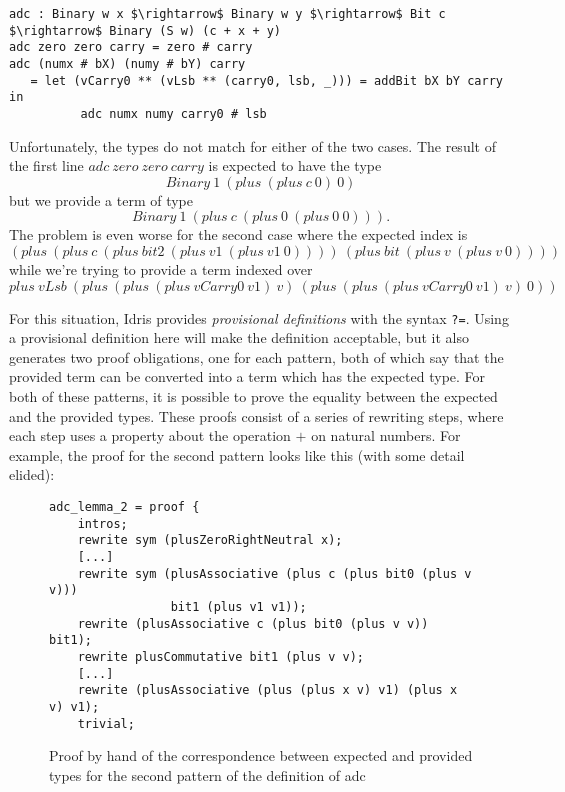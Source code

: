 \begin{lstlisting}
adc : Binary w x $\rightarrow$ Binary w y $\rightarrow$ Bit c $\rightarrow$ Binary (S w) (c + x + y)
adc zero zero carry = zero # carry
adc (numx # bX) (numy # bY) carry
   = let (vCarry0 ** (vLsb ** (carry0, lsb, _))) = addBit bX bY carry in
          adc numx numy carry0 # lsb
\end{lstlisting}

Unfortunately, the types do not match for either of the two cases. 
The result of the first line $adc\ zero\ zero\ carry$ is
expected to have the type\[Binary\ 1\ (plus\ (plus\ c\ 0)\ 0)\] but we
provide a term of type \[Binary\ 1\ (plus\ c\ (plus\ 0\ (plus\ 0\ 0))).\]
The problem is even worse for the second case where the expected index is 
\[(plus\ (plus\ c\ (plus\ bit2\ (plus\ v1\ (plus\ v1\ 0))))\ (plus\ bit\ (plus\ v\ (plus\ v\ 0))))\] while we're trying to provide a term indexed over 
\[plus\ vLsb\ (plus\ (plus\ (plus\ vCarry0\ v1)\ v)\ (plus\ (plus\ (plus\ vCarry0\ v1)\ v)\ 0))\]

For
this situation, Idris provides \emph{provisional definitions} with the 
syntax \texttt{?=}. Using a provisional definition here will make
the definition acceptable, but it also generates two proof obligations, one
for each pattern, both of which say that the provided term can be
converted into a term which has the expected type.  For both of these
patterns, it is possible to prove the equality between the expected and
the provided types. These proofs
consist of a series of rewriting steps, where each step uses a property about the
operation $+$ on natural numbers.  For example, the proof for the second
pattern looks like this (with some detail elided):

\begin{figure}[H]
\figrule
\begin{center}
\begin{lstlisting}
adc_lemma_2 = proof {
    intros;
    rewrite sym (plusZeroRightNeutral x);
    [...]
    rewrite sym (plusAssociative (plus c (plus bit0 (plus v v))) 
                 bit1 (plus v1 v1));
    rewrite (plusAssociative c (plus bit0 (plus v v)) bit1);
    rewrite plusCommutative bit1 (plus v v);
    [...]
    rewrite (plusAssociative (plus (plus x v) v1) (plus x v) v1);
    trivial;
\end{lstlisting}
\end{center}
\caption{Proof by hand of the correspondence between expected and provided types for the second pattern of the definition of adc}
\label{adc_lemma_2}
\figrule
\end{figure}


